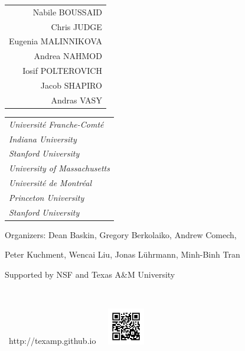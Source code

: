 \documentclass[a3,portrait]{a0poster}
\begin{document}
\bf
\normalsize
\Large
\hskip -1.9cm
\begin{tabular}{r}
Nabile BOUSSAID
\\
Chris JUDGE
\\
Eugenia MALINNIKOVA
\\
Andrea NAHMOD
\\
Iosif POLTEROVICH
\\
Jacob SHAPIRO
\\
Andras VASY
\end{tabular}
\begin{tabular}{l}
\it
Universit\'{e} Franche-Comt\'{e}
\\
\it
Indiana University
\\
\it
Stanford University
\\
\it
University of Massachusetts
\\
\it
Universit\'{e} de Montr\'{e}al
\\
\it
Princeton University
\\
\it
Stanford University
\end{tabular}


\vskip 3cm

\color{MidnightBlue}

\normalsize

{\bsifamily Organizers:}
Dean Baskin, Gregory Berkolaiko, Andrew Comech,

Peter Kuchment,
Wencai Liu, Jonas L\"{u}hrmann, Minh-Binh Tran


\vskip 0.5cm

\hskip 4cm
Supported by NSF and
Texas A\&M University


\vskip 1cm

\hskip 11.7cm
\mbox{
\normalsize
}


\vskip -16mm

\hskip 12cm
\mbox{
http://texamp.github.io
   \ \ \includegraphics[height=16mm,trim=0 11mm 0 -11mm]{texamp-2024-qr.png}
}
\end{document}
